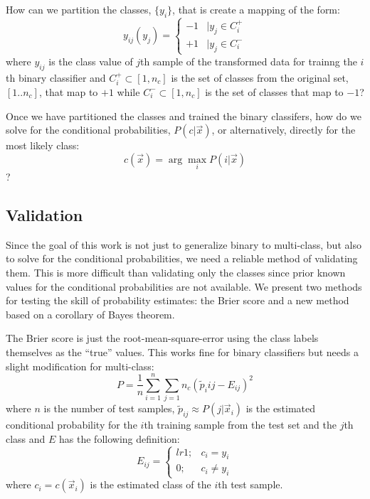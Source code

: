 \documentclass{article}
\begin{document}
How can we partition the classes, $\lbrace y_i \rbrace$, that is create
a mapping of the form:
\begin{equation}
	y_{ij} (y_j) = \left \lbrace  \begin{array}{lr}
-1 & | y_j \in C_i^+ \\
+1 & | y_j \in C_i^-
\end{array}
\right .
\end{equation}
where $y_{ij}$ is the class value of $j$th sample of the transformed data 
for trainng the $i$th binary classifier and 
$C_i^+ \subset [1,n_c]$ is the set of classes from the original set, 
$[1..n_c]$, that map to $+1$ while
$C_i^- \subset [1,n_c]$ is the set of classes that map to $-1$?

Once we have partitioned the classes
and trained the binary classifers,
how do we solve for the conditional probabilities, $P(c|\vec x)$,
or alternatively, directly for the most likely class:
\begin{equation}
	c(\vec x)=\arg \max_i P(i | \vec x)
\end{equation}
?

\subsection{Validation}

Since the goal of this work is not just to generalize binary to multi-class,
but also to solve for the conditional probabilities, we need a reliable
method of validating them.
This is more difficult than validating only the classes since prior known values
for the conditional probabilities are not available.
We present two methods for testing the skill of probability estimates:
the Brier score \citep{Brier1950} and a new method based on a corollary of Bayes
theorem.

The Brier score is just the root-mean-square-error using the class labels
themselves as the ``true'' values. This works fine for binary classifiers but
needs a slight modification for multi-class:
\begin{equation}
	P=\frac{1}{n} \sum_{i=1}^{n} \sum_{j=1}{n_c} \left ( \tilde p_i{ij} - E_{ij} \right )^2
\end{equation}
where $n$ is the number of test samples,
$\tilde p_{ij} \approx P(j | \vec x_i)$ is the estimated conditional probability for the $i$th training sample from the test set and the $j$th class
and $E$ has the following definition:
\begin{equation}
	E_{ij} = \left \lbrace \begin{matrix}{lr}
		1; & c_i = y_i \\
		0; & c_i \ne y_i
	\end{matrix} \right .
\end{equation}
where $c_i=c(\vec x_i)$ is the estimated class of the $i$th test sample.
\end{document}
